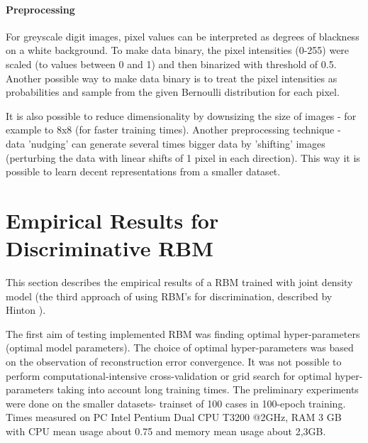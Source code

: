 \documentclass[a4paper]{scrartcl}
\begin{document}
\paragraph{Preprocessing} For greyscale digit images, pixel values can be interpreted as degrees of blackness on a white background. To make data binary, the pixel intensities (0-255) were scaled (to values between 0 and 1) and then binarized with threshold of 0.5. Another possible way to make data binary is to treat the pixel intensities as probabilities and sample from the given Bernoulli distribution for each pixel. 
\par It is also possible to reduce dimensionality by downsizing the size of images - for example to 8x8 (for faster training times). Another preprocessing technique - data 'nudging' can generate several times bigger data by 'shifting' images (perturbing the data with linear shifts of 1 pixel in each direction). This way it is possible to learn decent representations from a smaller dataset.
 
 
 
\section{Empirical Results for Discriminative RBM}
This section describes the empirical results of a RBM trained with joint density model (the third approach of using RBM's for discrimination, described by Hinton \cite{Hinton}).
\par The first aim of testing implemented RBM was finding optimal hyper-parameters (optimal model parameters). The choice of optimal hyper-parameters was based on the observation of reconstruction error convergence. It was not possible to perform computational-intensive cross-validation or grid search for optimal hyper-parameters taking into account long training times. The preliminary experiments were done on the smaller datasets- trainset of 100 cases in 100-epoch training. Times measured on PC Intel Pentium Dual CPU T3200 @2GHz, RAM 3 GB with CPU mean usage about 0.75 and memory mean usage about 2,3GB.
\end{document}
